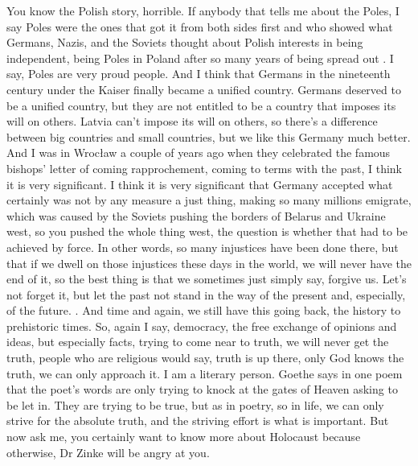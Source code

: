 You know the Polish story, horrible. If anybody that tells me about the Poles, I say Poles were the ones that got it from both sides first and who showed what Germans, Nazis, and the Soviets thought about Polish interests in being independent, being Poles in Poland after so many years of being spread out . I say, Poles are very proud people. And I think that Germans in the nineteenth century under the Kaiser finally became a unified country. Germans deserved to be a unified country, but they are not entitled to be a country that imposes its will on others. Latvia can't impose its will on others, so there's a difference between big countries and small countries, but we like this Germany much better. And I was in Wrocław a couple of years ago when they celebrated the famous bishops’ letter of coming rapprochement, coming to terms with the past, I think it is very significant. I think it is very significant that Germany accepted what certainly was not by any measure a just thing, making so many millions emigrate, which was caused by the Soviets pushing the borders of Belarus and Ukraine west, so you pushed the whole thing west, the question is whether that had to be achieved by force. In other words, so many injustices have been done there, but that if we dwell on those injustices these days in the world, we will never have the end of it, so the best thing is that we sometimes just simply say, forgive us. Let's not forget it, but let the past not stand in the way of the present and, especially, of the future. . And time and again, we still have this going back, the history to prehistoric times. So, again I say, democracy, the free exchange of opinions and ideas, but especially facts, trying to come near to truth, we will never get the truth, people who are religious would say, truth is up there, only God knows the truth, we can only approach it. I am a literary person. Goethe says in one poem that the poet’s words are only trying to knock at the gates of Heaven asking to be let in. They are trying to be true, but as in poetry, so in life, we can only strive for the absolute truth, and the striving effort is what is important. 
But now ask me, you certainly want to know more about Holocaust because otherwise, Dr Zinke will be angry at you. 
